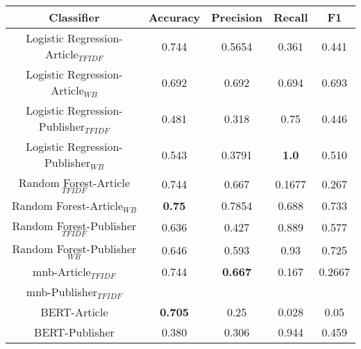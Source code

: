 \documentclass[a4paper, 11pt,titlepage,oneside,openany]{book}
\begin{document}
\begin{table}[h]
	\centering
	\begin{tabular}{c|c|c|c|c}
		\toprule
		Classifier & Accuracy & Precision & Recall &F1  \\
		\midrule
		Logistic Regression-Article$_{TFIDF}$ & 0.744 & 0.5654 & 0.361 & 0.441 \\
		Logistic Regression-Article$_{WB}$ & 0.692 & 0.692 & 0.694 & 0.693 \\
		Logistic Regression-Publisher$_{TFIDF}$ & 0.481 & 0.318 & 0.75 & 0.446 \\
		Logistic Regression-Publisher$_{WB}$ & 0.543 & 0.3791 & \textbf{1.0} & 0.510 \\
		Random Forest-Article$_{TFIDF}$ & 0.744 & 0.667 & 0.1677 & 0.267 \\
		Random Forest-Article$_{WB}$ & \textbf{0.75} & 0.7854 & 0.688 & 0.733 \\
		Random Forest-Publisher$_{TFIDF}$ & 0.636 & 0.427 & 0.889 & 0.577 \\
		Random Forest-Publisher$_{WB}$ & 0.646 & 0.593 & 0.93 & 0.725 \\
		\gls{mnb}-Article$_{TFIDF}$ & 0.744 & \textbf{0.667} & 0.167 & 0.2667 \\
		\gls{mnb}-Publisher$_{TFIDF}$ &  &  &  &  \\
		BERT-Article & \textbf{0.705} & 0.25 & 0.028 & 0.05 \\
		BERT-Publisher & 0.380 & 0.306 & 0.944 & 0.459 \\
		\bottomrule
	\end{tabular}

\end{table}
\end{document}
